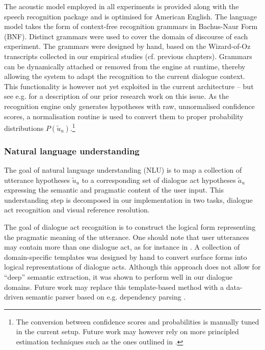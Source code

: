 The acoustic model employed in all experiments is provided along with the speech recognition package and is optimised for American English. The language model takes the form of context-free recognition grammars in Bachus-Naur Form (BNF). Distinct grammars were used to cover the domain of discourse of each experiment. The grammars were designed by hand, based on the Wizard-of-Oz transcripts collected in our empirical studies (cf. previous chapters). Grammars can be dynamically attached or removed from the engine at runtime, thereby allowing the system to adapt the recognition to the current dialogue context. This functionality is however not yet exploited in the current architecture -- but see e.g. \cite{ESSLLI2008-springerreprint} for a description of our prior research work on this issue. As the recognition engine only generates hypotheses with raw, unnormalised confidence scores, a normalisation routine is used to convert them to proper probability distributions $P(\tilde{u}_u)$.\footnote{The conversion between confidence scores and probabilities is manually tuned in the current setup.  Future work may however rely on more principled estimation techniques such as the ones outlined in \cite{Williams08}.}


\subsubsection*{Natural language understanding}

The goal of natural language understanding (NLU) is to map a collection of utterance hypotheses $\tilde{u}_u$ to a corresponding set of dialogue act hypotheses $\tilde{a}_u$ expressing the semantic and pragmatic content of the user input. This understanding step is decomposed in our implementation in two tasks, dialogue act recognition and visual reference resolution.  

The goal of dialogue act recognition is to construct the logical form representing the pragmatic meaning of the utterance. One should note that user utterances may contain more than one dialogue act, as for instance in .  A collection of domain-specific templates was designed by hand to convert surface forms into logical representations of dialogue acts.  Although this approach does not allow for ``deep'' semantic extraction, it was shown to perform well in our dialogue domains. Future work may replace this template-based method with a data-driven semantic parser based on e.g.  dependency parsing \citep{Nivre:Etal07}.  

